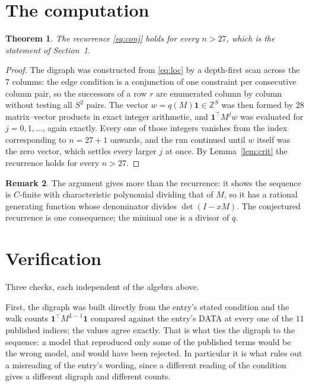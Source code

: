 \documentclass[11pt,a4paper]{article}
\theoremstyle{plain}
\newtheorem{theorem}{Theorem}
\theoremstyle{definition}
\newtheorem{remark}[theorem]{Remark}
\begin{document}
\section{The computation}

\begin{theorem}
The recurrence \eqref{eq:conj} holds for every $n>27$, which is the statement of
Section~1.
\end{theorem}

\begin{proof}
The digraph was constructed from \eqref{eq:loc} by a depth-first scan across the $7$
columns: the edge condition is a conjunction of one constraint per consecutive column
pair, so the successors of a row $r$ are enumerated column by column without testing all
$S^2$ pairs. The vector $w=q(M)\mathbf{1}\in\mathbb{Z}^{S}$ was then formed by $28$
matrix--vector products in exact integer arithmetic, and $\mathbf{1}^{\!\top}M^{j}w$ was
evaluated for $j=0,1,\dots$, again exactly. Every one of those integers vanishes from the
index corresponding to $n=27+1$ onwards, and the run continued until $w$ itself was the
zero vector, which settles every larger $j$ at once. By Lemma~\ref{lem:crit} the recurrence
holds for every $n>27$.
\end{proof}

\begin{remark}
The argument gives more than the recurrence: it shows the sequence is $C$-finite with
characteristic polynomial dividing that of $M$, so it has a rational generating function
whose denominator divides $\det(I-xM)$. The conjectured recurrence is one consequence; the
minimal one is a divisor of $q$.
\end{remark}

\section{Verification}

Three checks, each independent of the algebra above.

First, the digraph was built directly from the entry's stated condition and the walk counts
$\mathbf{1}^{\!\top}M^{L-1}\mathbf{1}$ compared against the entry's DATA at
every one of the $11$ published indices; the values agree exactly. That is what ties
the digraph to the sequence: a model that reproduced only some of the published terms would
be the wrong model, and would have been rejected. In particular it is what rules out a
misreading of the entry's wording, since a different reading of the condition gives a
different digraph and different counts.
\end{document}
